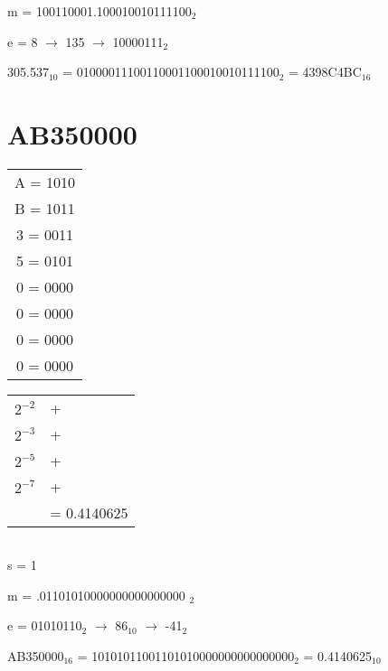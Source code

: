 \documentclass{article}
\begin{document}
m = 100110001.100010010111100$_2$

e = 8 $\rightarrow$ 135 $\rightarrow$ 10000111$_2$

305.537$_{10}$ = 01000011100110001100010010111100$_2$ = 4398C4BC$_{16}$\pagebreak

\section{AB350000}\begin{multicols}{2}\begin{center}\begin{tabular}{c}
A = 1010 \\
B = 1011 \\
3 = 0011 \\
5 = 0101 \\
0 = 0000 \\
0 = 0000 \\
0 = 0000 \\
0 = 0000 \\
\end{tabular}

\begin{tabular}{r | l}
$2^{-2}$ & + \\
$2^{-3}$ & + \\
$2^{-5}$ & + \\
$2^{-7}$ & + \\& = 0.4140625\\
 \end{tabular}

\begin{tabular}{r | l}
\end{tabular}
\end{center}\end{multicols}

s = 1

m = .01101010000000000000000 $_2$

e = 01010110$_2$ $\rightarrow$ 86$_10$ $\rightarrow$ -41$_2$

AB350000$_{16}$ = 10101011001101010000000000000000$_2$ = 0.4140625$_{10}$\pagebreak
\end{document}
